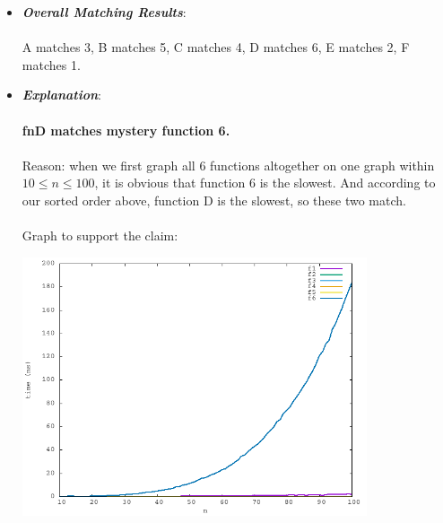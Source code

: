 \documentclass{article}
\begin{document}
    \begin{itemize}
        \item \textbf{\textit{Overall Matching Results}}: \\ \\
            A matches 3, B matches 5, C matches 4, D matches 6, E matches 2, F matches 1.
        \item \textbf{\textit{Explanation}}: \\ \\ 
            \textbf{fnD matches mystery function 6.} \\ \\
            Reason: when we first graph all 6 functions altogether on one graph within $10 \leq n \leq 100$, it is obvious that function 6 is the slowest.
            And according to our sorted order above, function D is the slowest, so these two match. \\ \\ 
            Graph to support the claim: 
            \begin{center}
                \includegraphics[width=0.8\textwidth]{f_all_10_100}
            \end{center}
    

\end{itemize}
\end{document}
